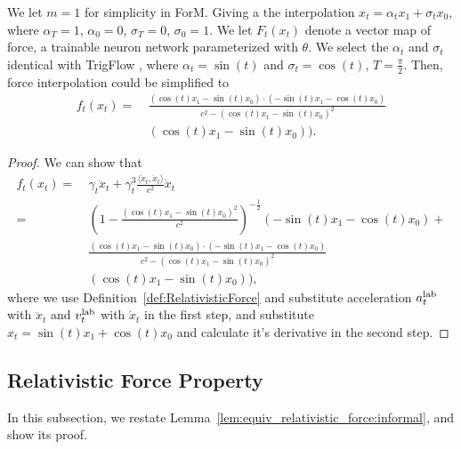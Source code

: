 \begin{theorem} \label{thm:form_trig:formal}
We let $m = 1$ for simplicity in ForM. Giving a the interpolation $x_t = \alpha_t x_1 + \sigma_t x_0$, where $\alpha_T = 1$, $\alpha_0 = 0$, $\sigma_T = 0$, $\sigma_0 = 1$. We let $F_t(x_t)$ denote a vector map of force, a trainable neuron network parameterized with $\theta$. We select the $\alpha_t$ and $\sigma_t$ identical with TrigFlow \cite{ls24}, where $\alpha_t = \sin(t)$ and $\sigma_t = \cos(t)$, $T = \frac{\pi}{2}$. Then, force interpolation could be simplified to 
\begin{align*}
    f_t(x_t) =
    & ~ \frac{(\cos(t)x_1 - \sin(t)x_0) \cdot (-\sin(t)x_1 - \cos(t)x_0)}{c^2 - (\cos(t)x_1 - \sin(t)x_0)^2}\\
    & ~ (\cos(t)x_1 - \sin(t)x_0)).
\end{align*}
\end{theorem}
\begin{proof}
    We can show that
    \begin{align*}
        f_t(x_t) = & ~ \gamma_t \ddot{x}_t + \gamma_t^3 \frac{\langle \dot{x}_t, \ddot{x}_t \rangle}{c^2}\dot{x}_t \\
        = & ~ (1 - \frac{(\cos(t)x_1 - \sin(t)x_0)^2}{c^2})^{-\frac{1}{2}} (-\sin(t)x_1 - \cos(t)x_0) + \\
        & ~ \frac{(\cos(t)x_1 - \sin(t)x_0) \cdot (-\sin(t)x_1 - \cos(t)x_0)}{c^2 - (\cos(t)x_1 - \sin(t)x_0)^2}\\
        & ~ (\cos(t)x_1 - \sin(t)x_0)),
    \end{align*}
    where we use Definition~\ref{def:RelativisticForce} and substitute acceleration $a_t^{\rm lab}$ with $\ddot{x}_t$ and $v_t^{\rm lab}$ with $\dot{x}_t$ in the first step, and substitute $x_t = \sin(t) x_1 + \cos(t) x_0$ and calculate it's derivative in the second step.
\end{proof}

\subsection{Relativistic Force Property} \label{sub:app:force}

In this subsection, we restate Lemma~\ref{lem:equiv_relativistic_force:informal}, and show its proof.

